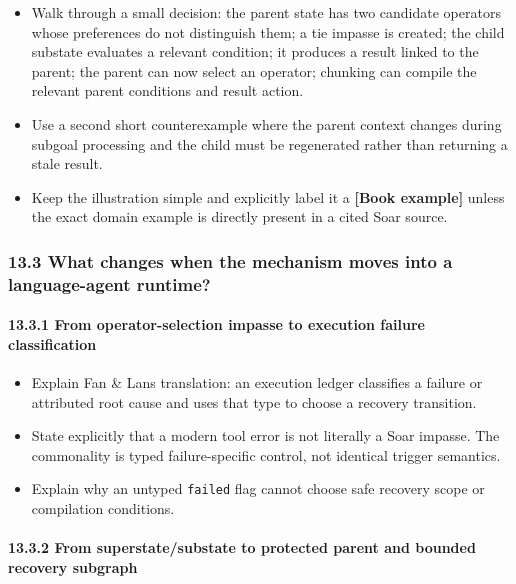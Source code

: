 \begin{itemize}
\tightlist
\item
  Walk through a small decision: the parent state has two candidate operators whose preferences do not distinguish them; a tie impasse is created; the child substate evaluates a relevant condition; it produces a result linked to the parent; the parent can now select an operator; chunking can compile the relevant parent conditions and result action.
\item
  Use a second short counterexample where the parent context changes during subgoal processing and the child must be regenerated rather than returning a stale result.
\item
  Keep the illustration simple and explicitly label it a \textbf{{[}Book example{]}} unless the exact domain example is directly present in a cited Soar source.
\end{itemize}

\subsubsection{13.3 What changes when the mechanism moves into a language-agent runtime?}\label{133-what-changes-when-the-mechanism-moves-into-a-language-agent-runtime}

\paragraph{13.3.1 From operator-selection impasse to execution failure classification}\label{1331-from-operator-selection-impasse-to-execution-failure-classification}

\begin{itemize}
\tightlist
\item
  Explain Fan \& Lan\textquotesingle s translation: an execution ledger classifies a failure or attributed root cause and uses that type to choose a recovery transition.
\item
  State explicitly that a modern tool error is not literally a Soar impasse. The commonality is typed failure-specific control, not identical trigger semantics.
\item
  Explain why an untyped \texttt{failed} flag cannot choose safe recovery scope or compilation conditions.
\end{itemize}

\paragraph{13.3.2 From superstate/substate to protected parent and bounded recovery subgraph}\label{1332-from-superstatesubstate-to-protected-parent-and-bounded-recovery-subgraph}

